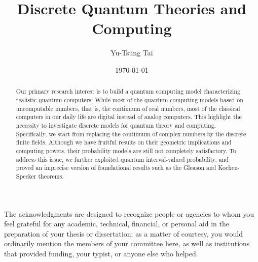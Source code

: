 \documentclass[twoside]{iuphd}
\begin{document}
\title{Discrete Quantum Theories and Computing}
\author{Yu-Tsung Tai}
\date{\today}

\acceptancepage



\begin{acknowledgments}
The acknowledgments are designed to recognize people or agencies to whom you feel grateful for any academic,
technical, financial, or personal aid in the preparation of your thesis or dissertation; as a matter of
courtesy, you would ordinarily mention the members of your committee here, as well as institutions that
provided funding, your typist, or anyone else who helped.
\end{acknowledgments}


\begin{abstract}
Our primary research interest is to build a quantum computing model
characterizing realistic quantum computers. While most of the quantum
computing models based on uncomputable numbers, that is, the continuum
of real numbers, most of the classical computers in our daily life
are digital instead of analog computers. This highlight the necessity
to investigate discrete models for quantum theory and computing. Specifically,
we start from replacing the continuum of complex numbers by the discrete
finite fields. Although we have fruitful results on their geometric
implications and computing powers, their probability models are still
not completely satisfactory. To address this issue, we further exploited
quantum interval-valued probability, and proved an imprecise version
of foundational results such as the Gleason and Kochen-Specker theorems. 
\end{abstract}
\tableofcontents{}
\end{document}
